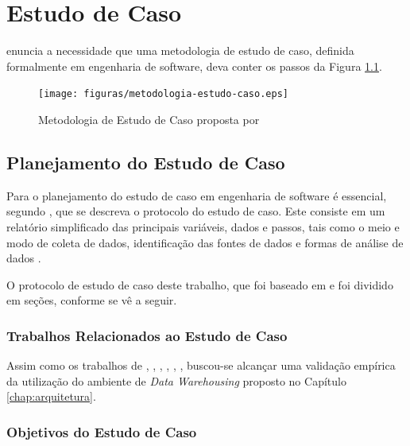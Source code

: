 \chapter{Estudo de Caso}
\label{estudo de caso}


 enuncia a necessidade que uma metodologia de estudo de caso, definida formalmente em engenharia de software, deva conter os passos da Figura \ref{fig:metodologia-estudo}.

\begin{figure}[ht!]
\centering
\texttt{[image: figuras/metodologia-estudo-caso.eps]}
\caption{Metodologia de Estudo de Caso proposta por }
\label{fig:metodologia-estudo}
\end{figure}
\FloatBarrier

\section{Planejamento do Estudo de Caso}
\label{sec:planning-case}
Para o planejamento do estudo de caso em engenharia de software é essencial, segundo , que se descreva o protocolo do estudo de caso. Este consiste em um relatório simplificado das principais variáveis, dados e passos, tais como o meio e modo de coleta de dados, identificação das fontes de dados e formas de análise de dados \cite{wohlin2012experimentation}. 


O protocolo de estudo de caso deste trabalho, que foi baseado em  e  foi dividido em seções, conforme se vê a seguir.


\subsection{Trabalhos Relacionados ao Estudo de Caso}

Assim como os trabalhos de , , , , , , buscou-se alcançar uma validação empírica da utilização do ambiente de \textit{Data Warehousing} proposto no Capítulo \ref{chap:arquitetura}.


\subsection{Objetivos do Estudo de Caso}

